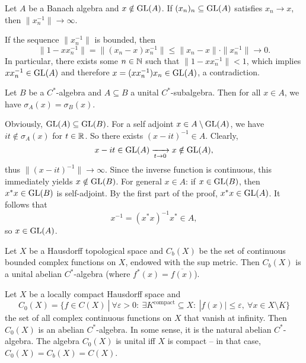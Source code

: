 \begin{lemma}
  Let $A$ be a Banach algebra and $x \notin \operatorname{GL}(A)$.
  If $(x_n)_n \subseteq \operatorname{GL}(A)$ satisfies $x_n \to x$, then $\|x_n ^{-1}\| \to \infty$.
\end{lemma}

\begin{myproof}
  If the sequence $\|x_n^{-1}\|$ is bounded, then 
  $$\| 1 - x x_n^{-1}\| = \| (x_n - x) x_n^{-1}\| \leq \| x_n - x\| \cdot \|x_n^{-1}\| \to 0.$$
  In particular, there exists some $n \in \mathbb {N}$ such that $\| 1 - xx_n^{-1}\| < 1$,
  which implies $x x_n^{-1} \in \operatorname{GL} (A)$ and therefore $x = (x x_n^{-1}) x_n \in \operatorname{GL}(A)$, a contradiction.
\end{myproof}

\begin{proposition}
  Let $B$ be a $C^*$-algebra and $A \subseteq B$ a unital $C^*$-subalgebra.
  Then for all $x \in A$, we have $\sigma_A (x) = \sigma_B (x)$.
\end{proposition}

\begin{myproof}
  Obviously, $\operatorname{GL} (A) \subseteq \operatorname{GL}(B)$. For a self adjoint $x \in A \setminus \operatorname{GL}(A)$, we have
  $it \notin \sigma_A (x)$ for $t \in \mathbb {R}$. So there exists $(x - it)^{-1} \in A$.
  Clearly, $$x - it \in \operatorname{GL}(A) \xrightarrow[t \to 0]{} x \notin \operatorname{GL}(A),$$
  thus $\| (x - it)^{-1}\| \to \infty$. Since the inverse function is continuous,
  this immediately yields $x \notin \operatorname{GL} (B)$.
  For general $x \in A$: if $x \in \operatorname{GL}(B)$, then $x^* x \in \operatorname{GL}(B)$ 
  is self-adjoint. By the first part of the proof, $x^* x \in \operatorname{GL}(A)$.
  It follows that 
  \begin{equation*}
    x^{-1} = (x^* x)^{-1} x^* \in A,
  \end{equation*}
  so $x \in \operatorname{GL}(A)$.
\end{myproof}

\begin{example}
  Let $X$ be a Hausdorff topological space and $C_b (X)$ be the set of continuous bounded complex functions on $X$,
  endowed with the sup metric. Then $C_b (X)$ is a unital abelian $C^*$-algebra (where $f^*(x) = \overline{f(x)}$).
\end{example}

\begin{example}
  Let $X$ be a locally compact Hausdorff space and 
  $$C_0 (X) = \{f \in C(X)\ |\ \forall\varepsilon > 0:\ \exists K^{\textrm{compact}} \subseteq X:\ |f(x)|\leq \varepsilon,\ \forall x \in X \setminus K\}$$ 
  the set of all complex continuous functions on $X$ that vanish at infinity.
  Then $C_0 (X)$ is an abelian $C^*$-algebra. In some sense, it is the natural abelian $C^*$-algebra.
  The algebra $C_0 (X)$ is unital iff $X$ is compact -- in that case, $C_0 (X) = C_b (X) = C(X)$.
\end{example}

